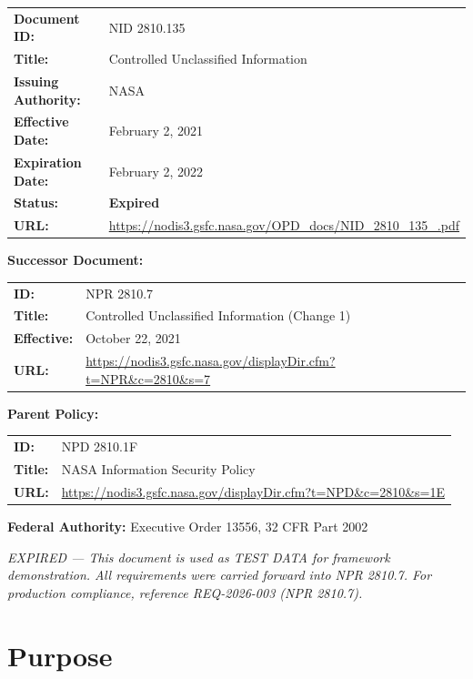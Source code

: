 \documentclass[11pt,letterpaper]{article}
\begin{document}
\begin{tabular}{@{}ll@{}}
\textbf{Document ID:} & NID 2810.135 \\
\textbf{Title:} & Controlled Unclassified Information \\
\textbf{Issuing Authority:} & NASA \\
\textbf{Effective Date:} & February 2, 2021 \\
\textbf{Expiration Date:} & February 2, 2022 \\
\textbf{Status:} & \textbf{Expired} \\
\textbf{URL:} & \url{https://nodis3.gsfc.nasa.gov/OPD_docs/NID_2810_135_.pdf} \\
\end{tabular}

\vspace{8pt}
\textbf{Successor Document:}
\begin{tabular}{@{}ll@{}}
\textbf{ID:} & NPR 2810.7 \\
\textbf{Title:} & Controlled Unclassified Information (Change 1) \\
\textbf{Effective:} & October 22, 2021 \\
\textbf{URL:} & \url{https://nodis3.gsfc.nasa.gov/displayDir.cfm?t=NPR&c=2810&s=7} \\
\end{tabular}

\vspace{8pt}
\textbf{Parent Policy:}
\begin{tabular}{@{}ll@{}}
\textbf{ID:} & NPD 2810.1F \\
\textbf{Title:} & NASA Information Security Policy \\
\textbf{URL:} & \url{https://nodis3.gsfc.nasa.gov/displayDir.cfm?t=NPD&c=2810&s=1E} \\
\end{tabular}

\vspace{8pt}
\textbf{Federal Authority:} Executive Order 13556, 32 CFR Part 2002

\vspace{8pt}
\textit{EXPIRED --- This document is used as TEST DATA for framework demonstration. All requirements were carried forward into NPR 2810.7. For production compliance, reference REQ-2026-003 (NPR 2810.7).}

\section{Purpose}
\end{document}
